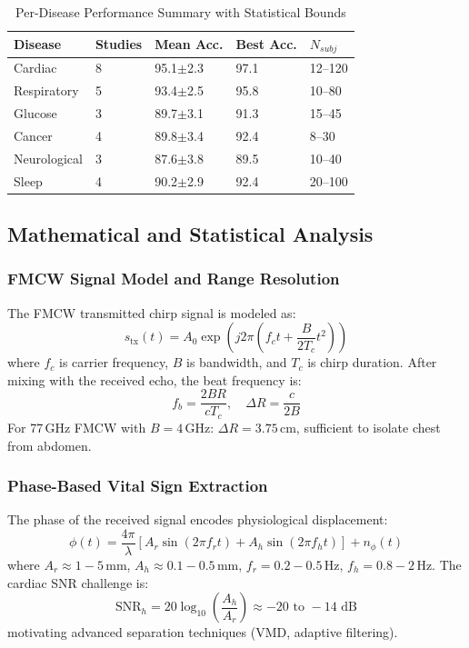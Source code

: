 \documentclass[journal,twoside]{IEEEtran}
\begin{document}
\begin{table}[!t]
\centering
\caption{Per-Disease Performance Summary with Statistical Bounds}
\label{tab:disease_summary}
\small
\begin{tabular}{@{}L{1.3cm}C{1.1cm}C{1.3cm}C{1.3cm}C{0.9cm}@{}}
\toprule
\textbf{Disease} & \textbf{Studies} & \textbf{Mean Acc.} & \textbf{Best Acc.} & \textbf{$N_{subj}$} \\
\midrule
Cardiac & 8 & 95.1$\pm$2.3 & 97.1 & 12--120 \\
Respiratory & 5 & 93.4$\pm$2.5 & 95.8 & 10--80 \\
Glucose & 3 & 89.7$\pm$3.1 & 91.3 & 15--45 \\
Cancer & 4 & 89.8$\pm$3.4 & 92.4 & 8--30 \\
Neurological & 3 & 87.6$\pm$3.8 & 89.5 & 10--40 \\
Sleep & 4 & 90.2$\pm$2.9 & 92.4 & 20--100 \\
\bottomrule
\end{tabular}
\end{table}

\subsection{Mathematical and Statistical Analysis}

\subsubsection{FMCW Signal Model and Range Resolution}
The FMCW transmitted chirp signal is modeled as:
\begin{equation}
s_{\text{tx}}(t) = A_0 \exp\left(j2\pi\left(f_c t + \frac{B}{2T_c}t^2\right)\right)
\label{eq:fmcw_chirp}
\end{equation}
where $f_c$ is carrier frequency, $B$ is bandwidth, and $T_c$ is chirp duration. After mixing with the received echo, the beat frequency is:
\begin{equation}
f_b = \frac{2BR}{cT_c}, \quad \Delta R = \frac{c}{2B}
\label{eq:beat_freq}
\end{equation}
For 77\,GHz FMCW with $B = 4$\,GHz: $\Delta R = 3.75$\,cm, sufficient to isolate chest from abdomen.

\subsubsection{Phase-Based Vital Sign Extraction}
The phase of the received signal encodes physiological displacement:
\begin{equation}
\phi(t) = \frac{4\pi}{\lambda}\left[A_r\sin(2\pi f_r t) + A_h\sin(2\pi f_h t)\right] + n_\phi(t)
\label{eq:vital_phase}
\end{equation}
where $A_r \approx 1{-}5$\,mm, $A_h \approx 0.1{-}0.5$\,mm, $f_r = 0.2{-}0.5$\,Hz, $f_h = 0.8{-}2$\,Hz. The cardiac SNR challenge is:
\begin{equation}
\text{SNR}_h = 20\log_{10}\left(\frac{A_h}{A_r}\right) \approx -20 \text{ to } -14\text{ dB}
\label{eq:cardiac_snr}
\end{equation}
motivating advanced separation techniques (VMD, adaptive filtering).
\end{document}
